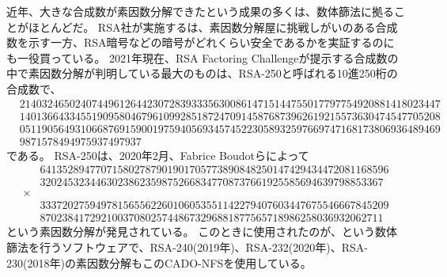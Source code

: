 近年、大きな合成数が素因数分解できたという成果の多くは、数体篩法に拠ることがほとんどだ。
RSA社が実施するは、素因数分解屋に挑戦しがいのある合成数を示す一方、RSA暗号などの暗号がどれくらい安全であるかを実証するのにも一役買っている。
2021年現在、RSA Factoring Challengeが提示する合成数の中で素因数分解が判明している最大のものは、RSA-250と呼ばれる10進250桁の合成数で、
\begin{align*}
&2140324650240744961264423072839333563008614715144755017797754920881418023447\\
&1401366433455190958046796109928518724709145876873962619215573630474547705208\\
&0511905649310668769159001975940569345745223058932597669747168173806936489469\\
&9871578494975937497937
\end{align*}
である。
RSA-250は、2020年2月、Fabrice Boudotらによって
\begin{align*}
&641352894770715802787901901705773890848250147429434472081168596\\
&32024532344630238623598752668347708737661925585694639798853367\\
\times&\\
&333720275949781565562260106053551142279407603447675546667845209\\
&87023841729210037080257448673296881877565718986258036932062711
\end{align*}
という素因数分解が発見されている。
このときに使用されたのが、という数体篩法を行うソフトウェアで、RSA-240(2019年)、RSA-232(2020年)、RSA-230(2018年)の素因数分解もこのCADO-NFSを使用している。

